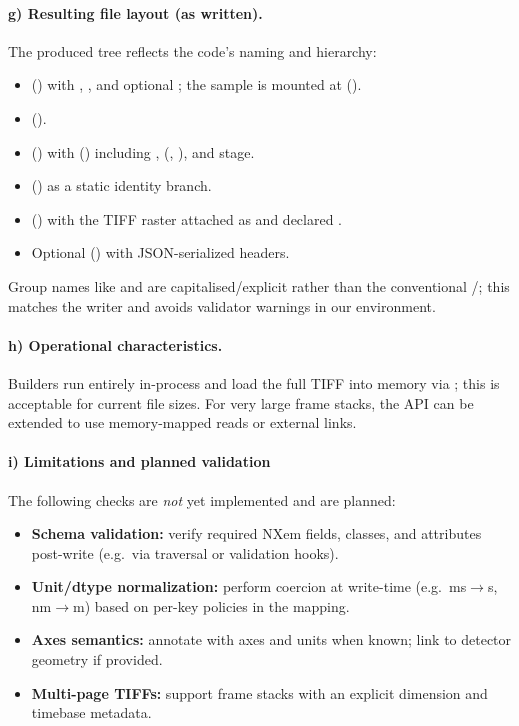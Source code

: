 \paragraph{g) Resulting file layout (as written).}
The produced tree reflects the code’s naming and hierarchy:
\begin{itemize}
	\item {} () with , , and optional ; the sample is mounted at  ().
	\item {} ().
	\item {} () with  () including ,  (, ), and  stage.
	\item {} () as a static identity branch.
	\item {} () with the TIFF raster attached as  and declared .
	\item Optional  () with JSON-serialized headers.
\end{itemize}
\noindent Group names like  and  are capitalised/explicit rather than the conventional /; this matches the writer and avoids validator warnings in our environment.

\paragraph{h) Operational characteristics.}
Builders run entirely in-process and load the full TIFF into memory via ; this is acceptable for current file sizes. For very large frame stacks, the API can be extended to use memory-mapped reads or external links.

\paragraph{i) Limitations and planned validation}\label{sec:nexus-construction-validation-future}
The following checks are \emph{not} yet implemented and are planned:
\begin{itemize}
	\item \textbf{Schema validation:} verify required NXem fields, classes, and attributes post-write (e.g.\ via  traversal or  validation hooks).
	\item \textbf{Unit/dtype normalization:} perform coercion at write-time (e.g.\ ms$\to$s, nm$\to$m) based on per-key policies in the mapping.
	\item \textbf{Axes semantics:} annotate  with axes and units when known; link to detector geometry if provided.
	\item \textbf{Multi-page TIFFs:} support frame stacks with an explicit  dimension and timebase metadata.
\end{itemize}

